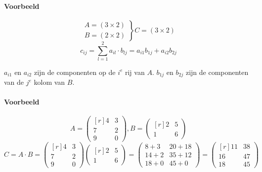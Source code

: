 \paragraph{Voorbeeld}
\[ \left.\begin{array}{l} A = (3 \times 2) \\
B = (2 \times 2) \end{array}\right\} C = (3 \times 2) \]
\[ c_{ij} = \sum\limits_{l=1}^2 a_{il} \cdot b_{lj} = a_{i1} b_{1j} + a_{i2} b_{2j} \]

$a_{i1}$ en $a_{i2}$ zijn de componenten op de $i^e$ rij van $A$. $b_{1j}$ en $b_{2j}$ zijn de componenten van de $j^e$ kolom van $B$.

\paragraph{Voorbeeld}
\[ A = \begin{pmatrix*}[r] 4 & 3 \\ 7 & 2 \\ 9 & 0 \end{pmatrix*}, B = \begin{pmatrix*}[r] 2 & 5 \\ 1 & 6 \end{pmatrix*} \]
\[ C = A \cdot B = \begin{pmatrix*}[r] 4 & 3 \\ 7 & 2 \\ 9 & 0 \end{pmatrix*} \begin{pmatrix*}[r] 2 & 5 \\ 1 & 6 \end{pmatrix*} = \begin{pmatrix} 8+3 & 20+18 \\ 14+2 & 35+12 \\ 18+0 & 45+0 \end{pmatrix} = \begin{pmatrix*}[r] 11 & 38 \\ 16 & 47 \\ 18 & 45 \end{pmatrix*} \]

